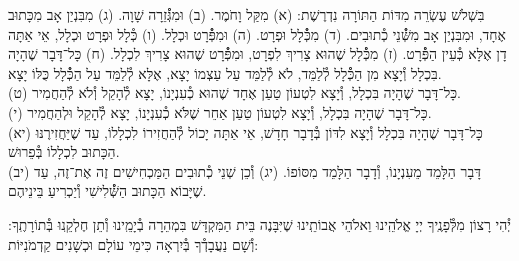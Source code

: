 \documentclass[twoside, openany, parskip=half, 11pt]{book}
\begin{document}
בִּשְׁלֹשׁ עֶשְׂרֵה מִדּוֹת הַתּוֹרָה נִדְרֶשֶׁת:\hfill \break
(א) מִקַּל וָחֹמֶר.\hfill \break
(ב) וּמִגְּ֯֯זֵרָה שָׁוָה.\hfill \break
(ג) מִבִּנְיַן אָב מִכָּתוּב אֶחָד, וּמִבִּנְיַן אָב מִשְּׁ֯֯נֵי כְ֯תוּבִים.\hfill \break
(ד) מִכְּ֯֯לָל וּפְרָט.\hfill \break
(ה) וּמִפְּ֯֯רָט וּכְלָל.\hfill \break
(ו) כְּ֯לָל וּפְרָט וּכְלָל, אֵי אַתָּה דָן אֶלָּא כְּ֯עֵין הַפְּ֯֯רָט.\hfill \break
(ז) מִכְּ֯֯לָל שֶׁהוּא צָרִיךְ לִפְרָט, וּמִפְּ֯֯רָט שֶׁהוּא צָרִיךְ לִכְלָל.\hfill \break
(ח) כָּל־דָּבָר שֶׁהָיָה בִּכְלָל וְ֯יָצָא מִן הַכְּ֯֯לָל לְ֯לַמֵּד, לֹא לְ֯לַמֵּד עַל עַצְמוֹ יָצָא, אֶלָּא לְ֯לַמֵּד עַל הַכְּ֯֯לָל כֻּלּוֹ יָצָא. \\
(ט) כָּל־דָּבָר שֶׁהָיָה בִּכְלָל, וְ֯יָצָא לִטְעוֹן טַעַן אֶחָד שֶׁהוּא כְ֯עִנְיָנוֹ, יָצָא לְ֯הָקֵל וְ֯לֹא לְ֯הַחֲמִיר. \\
(י) כָּל־דָּבָר שֶׁהָיָה בִּכְלָל, וְ֯יָצָא לִטְעוֹן טַעַן אַחֵר שֶׁלֹּא כְ֯עִנְיָנוֹ, יָצָא לְ֯הָקֵל וּלְהַחֲמִיר. \\
(יא) כָּל־דָּבָר שֶׁהָיָה בִּכְלָל וְ֯יָצָא לִדּוֹן בְּ֯דָבָר חָדָשׁ, אֵי אַתָּה יָכוֹל לְ֯הַחֲזִירוֹ לִכְלָלוֹ, עַד שֶׁיַּחֲזִירֶנּוּ הַכָּתוּב לִכְלָלוֹ בְּ֯פֵרוּשׁ. \\
(יב) דָּבָר הַלָּמֵד מֵעִנְיָנוֹ, וְ֯דָבָר הַלָּמֵד מִסּוֹפוֹ.\hfill \break
(יג) וְ֯כֵן שְׁנֵי כְ֯תוּבִים הַמַּכְחִישִׁים זֶה אֶת־זֶה, עַד שֶׁיָּבוֹא הַכָּתוּב הַשְּׁ֯֯לִישִׁי וְ֯יַכְרִיעַ בֵּינֵיהֶם.

יְ֯הִי רָצוֹן מִלְּ֯פָנֶֽיךָ יְיָ אֱלֹהֵֽינוּ וֵאלֹהֵי אֲבוֹתֵֽינוּ שֶׁיִּבָּנֶה בֵּית הַמִּקְדָּשׁ בִּמְהֵרָה בְ֯יָמֵֽינוּ וְ֯תֵן חֶלְקֵֽנוּ בְּ֯תוֹרָתֶֽךָ: וְ֯שָׁם נַעֲבָדְ֯ךָ בְּ֯יִרְאָה כִּימֵי עוֹלָם וּכְשָׁנִים קַדְמֹנִיּוֹת:


\rabbiskaddish
\end{document}
